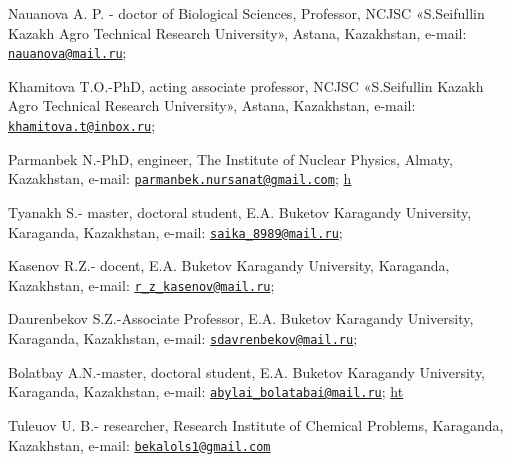 Nauanova A. P. - doctor of Biological Sciences, Professor, NCJSC
«S.Seifullin Kazakh Agro Technical Research University», Astana,
Kazakhstan, e-mail:
\href{mailto:nauanova@mail.ru}{\nolinkurl{nauanova@mail.ru}};

Khamitova T.O.-PhD, acting associate professor, NCJSC «S.Seifullin
Kazakh Agro Technical Research University», Astana, Kazakhstan, e-mail:
\href{mailto:khamitova.t@inbox.ru}{\nolinkurl{khamitova.t@inbox.ru}};

Parmanbek N.-PhD, engineer, The Institute of Nuclear Physics, Almaty,
Kazakhstan, e-mail:
\href{mailto:parmanbek.nursanat@gmail.com}{\nolinkurl{parmanbek.nursanat@gmail.com}};
\href{https://orcid.org/00000-0002-9860-1087}{h}

Tyanakh S.- master, doctoral student, E.A. Buketov Karagandy University,
Karaganda, Kazakhstan, e-mail:
\href{mailto:saika_8989@mail.ru}{\nolinkurl{saika\_8989@mail.ru}};

Kasenov R.Z.- docent, E.A. Buketov Karagandy University, Karaganda,
Kazakhstan, e-mail:
\href{mailto:r_z_kasenov@mail.ru}{\nolinkurl{r\_z\_kasenov@mail.ru}};

Daurenbekov S.Z.-Associate Professor, E.A. Buketov Karagandy University,
Karaganda, Kazakhstan, e-mail:
\href{mailto:sdavrenbekov@mail.ru}{\nolinkurl{sdavrenbekov@mail.ru}};

Bolatbay A.N.-master, doctoral student, E.A. Buketov Karagandy
University, Karaganda, Kazakhstan, e-mail:
\href{mailto:abylai_bolatabai@mail.ru}{\nolinkurl{abylai\_bolatabai@mail.ru}};
\href{https://orcid.org/0000-0001-5047-3066}{ht}

Tuleuov U. B.- researcher, Research Institute of Chemical Problems,
Karaganda, Kazakhstan, e-mail:
\href{mailto:bekalols1@gmail.com}{\nolinkurl{bekalols1@gmail.com}}
